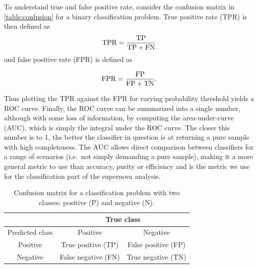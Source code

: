 To understand true and false positive rate, consider the confusion
matrix in \autoref{table:confusion} for a binary classification
problem. True positive rate (TPR) is then defined as
\begin{equation}
 \rm{TPR} = \frac{\rm{TP}}{\rm{TP}+\rm{FN}}
\end{equation}
and false positive rate (FPR) is defined as

\begin{equation}
 \rm{FPR} = \frac{\rm{FP}}{\rm{FP}+\rm{TN}}.
\end{equation}

Thus plotting the TPR against the FPR for varying probability threshold
yields a ROC curve.  Finally, the ROC curve can be summarized into a
single number, although with some loss of information, by computing the
area-under-curve (AUC), which is simply the integral under the ROC
curve. The closer this number is to 1, the better the classifier in
question is at returning a pure sample with high completeness. The AUC
allows direct comparison between classifiers for a range of scenarios
(i.e.\ not simply demanding a pure sample), making it a more general
metric to use than accuracy, purity or efficiency and is the metric we
use for the classification part of the supernova analysis.

\begin{table}
\centering
 \begin{tabular}{|c|c|c|}
 \hline
  & \multicolumn{2}{|c|}{True class}\\
  \hline
  Predicted class & Positive & Negative\\
  \hline
  Positive & True positive (TP) & False positive (FP)\\
  \hline
  Negative & False negative (FN) & True negative (TN)\\
  \hline
 \end{tabular}

 \label{table:confusion}
 \caption{Confusion matrix for a classification problem with two classes: positive (P) and negative
(N).}
\end{table}



